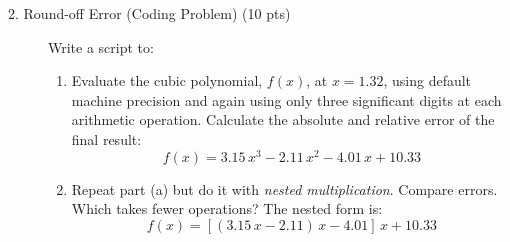 \documentclass[12pt]{article}
\begin{document}
\begin{description}
\item[2. Round-off Error \color{red} (Coding Problem) \color{black} (10 pts)] Write a script to:
\begin{enumerate}[label=\textbf{(\alph*)}]
\item Evaluate the cubic polynomial, $f (x)$, at $x = 1.32$, using default machine precision and again using only three significant digits at each arithmetic operation. Calculate the absolute and relative error of the final result:
    \begin{equation*}
        f (x) = 3.15 \, x^3 - 2.11 \, x^2 - 4.01 \, x + 10.33
    \end{equation*}
    \item Repeat part (a) but do it with \emph{nested multiplication}. Compare errors. Which takes fewer operations? The nested form is:
    \begin{equation*}
        f (x) = [(3.15 \, x - 2.11) \, x - 4.01] \, x + 10.33
    \end{equation*}
    \end{enumerate}
    

\end{description}
\end{document}

